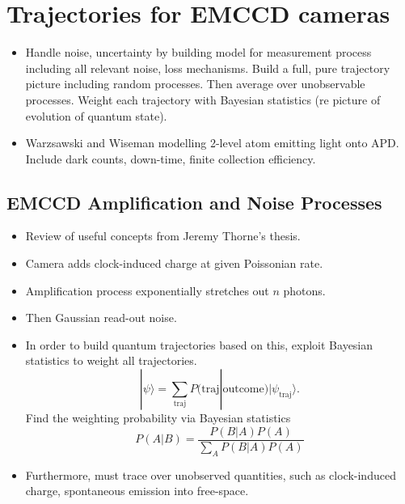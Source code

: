       \section{Trajectories for EMCCD cameras}

      \begin{itemize}
        \item Handle noise, uncertainty by building model for measurement process
          including all relevant noise, loss mechanisms.  Build a full, pure 
          trajectory picture including random processes.
          Then average over unobservable processes.   Weight each trajectory
          with Bayesian statistics (re picture of evolution of quantum state). 
        \item Warzsawski and Wiseman modelling 2-level atom emitting light onto 
          APD.  Include dark counts, down-time, finite collection efficiency.
      \end{itemize}
      

      \subsection{EMCCD Amplification and Noise Processes}

      \begin{itemize}
        \item Review of useful concepts from Jeremy Thorne's thesis.  
        \item Camera adds clock-induced charge at given Poissonian rate.
        \item Amplification process exponentially stretches out $n$ photons.
        \item Then Gaussian read-out noise.  
      \end{itemize}

      \begin{itemize}
          \item In order to build quantum trajectories based on this, exploit Bayesian statistics
          to weight all trajectories.  
          \begin{equation}
            |\psi\rangle = \sum_{\text{traj}} P(\text{traj}|\text{outcome})|\psi_{\text{traj}}\rangle.
          \end{equation}
          Find the weighting probability via Bayesian statistics
          \begin{equation}
            P(A|B) = \frac{P(B|A)P(A)}{\sum_AP(B|A)P(A)}
          \end{equation}
          \item Furthermore, must trace over unobserved quantities, such as clock-induced 
          charge, spontaneous emission into free-space.  
      \end{itemize}

      

